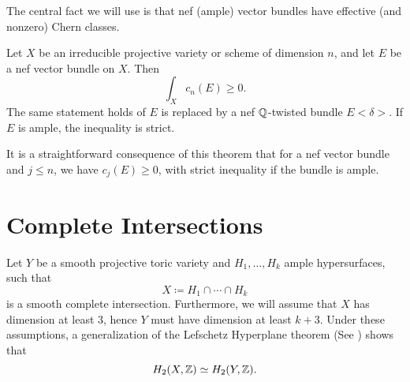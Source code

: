 The central fact we will use is that nef (ample) vector bundles have effective (and nonzero) Chern classes.
\begin{theorem}
  	\label{thm:ChernPositive}
	Let $X$ be an irreducible projective variety or scheme of dimension $n$, and let $E$ be a nef vector bundle on $X$. Then
	\[ \int_X c_n(E) \geq  0.\]
	The same statement holds of $E$ is replaced by a nef $\mathbb{Q}$-twisted bundle $E\!<\! \delta \!>$. If $E$ is ample, the inequality is strict.
\end{theorem}
It is a straightforward consequence of this theorem that for a nef vector bundle and $j \leq n$, we have $c_j(E) \geq 0$, with strict inequality if the bundle is ample.




\section{Complete Intersections}
\label{sec:CompleteIntersection}
Let $Y$ be a smooth projective toric variety and $H_1, \dots, H_k$ ample hypersurfaces, such that 
\[X \coloneqq H_1 \cap \cdots \cap H_k\]
is a smooth complete intersection. Furthermore, we will assume that $X$ has dimension at least 3, hence $Y$ must have dimension at least $k+3$. Under these assumptions, a generalization of the Lefschetz Hyperplane theorem (See \cite[Remark 3.1.32]{Laz04II}) shows that 
\begin{equation}
  \label{eq:LefschetzHyperplane}
  H_2(X,\mathbb{Z}) \simeq H_2(Y,\mathbb{Z}).
\end{equation}

